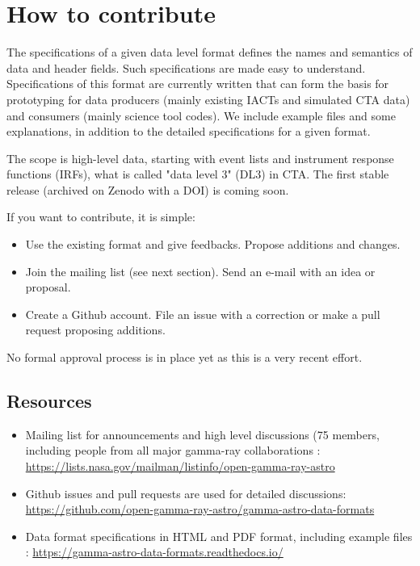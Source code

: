 \section{How to contribute}

The specifications of a given data level format defines the names and semantics of data and header fields. Such specifications are made easy to understand. Specifications of this format are currently written that can form the basis for prototyping for data producers (mainly existing IACTs and simulated CTA data) and consumers (mainly science tool codes). We include example files and some explanations, in addition to the detailed specifications for a given format. 

The scope is high-level data, starting with event lists and instrument response functions (IRFs), what is called "data level 3" (DL3) in CTA. The first stable release (archived on Zenodo with a DOI) is coming soon.

If you want to contribute, it is simple:

\begin{itemize}
\item{}Use the existing format and give feedbacks. Propose additions and changes.
\item{}Join the mailing list (see next section). Send an e-mail with an idea or proposal.
\item{}Create a Github account. File an issue with a correction or make a pull request proposing additions.
\end{itemize}

No formal approval process is in place yet as this is a very recent effort.

\subsection{Resources}

\begin{itemize}
\item{}Mailing list for announcements and high level discussions (75 members, including people from all major gamma-ray collaborations : \url{https://lists.nasa.gov/mailman/listinfo/open-gamma-ray-astro}
\item{}Github issues and pull requests are used for detailed discussions: \url{https://github.com/open-gamma-ray-astro/gamma-astro-data-formats}
\item{}Data format specifications in HTML and PDF format, including example files : \url{https://gamma-astro-data-formats.readthedocs.io/}
\end{itemize}

